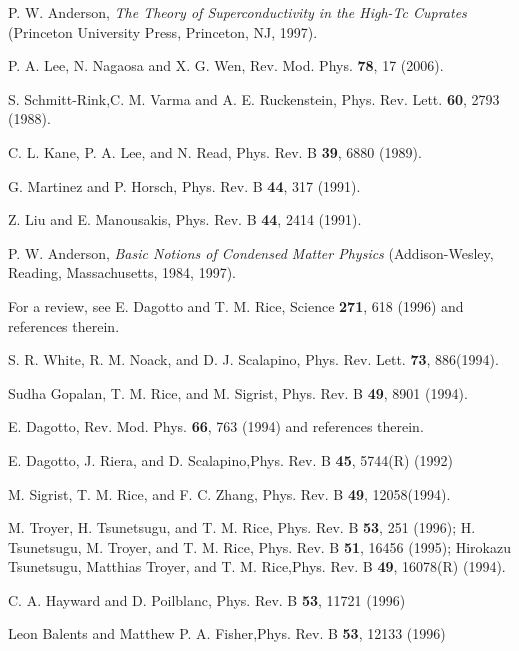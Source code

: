 \documentclass[aps,prb,twocolumn,notitlepage,superscriptaddress,showpacs]{revtex4-1}
\begin{document}
\begin{thebibliography}{99}

 P. W. Anderson, \emph{The Theory of Superconductivity in the High-Tc Cuprates} (Princeton University Press, Princeton, NJ, 1997).

 P. A. Lee, N. Nagaosa and X. G. Wen,  Rev. Mod. Phys. \textbf{78}, 17 (2006).

 S. Schmitt-Rink,C. M. Varma and A. E. Ruckenstein,   Phys. Rev. Lett. \textbf{60}, 2793 (1988).

 C. L. Kane, P. A. Lee, and N. Read,  Phys. Rev. B \textbf{39}, 6880 (1989).

 G. Martinez and P. Horsch, Phys. Rev. B \textbf{44}, 317 (1991).

 Z. Liu and E. Manousakis,  Phys. Rev. B \textbf{44}, 2414 (1991).

   P. W. Anderson, \emph{Basic Notions of Condensed Matter Physics} (Addison-Wesley, Reading, Massachusetts, 1984, 1997).

  For a review, see E. Dagotto and T. M. Rice, Science \textbf{271}, 618 (1996) and references therein.

 S. R. White, R. M. Noack, and D. J. Scalapino, Phys. Rev. Lett. \textbf{73}, 886(1994).

 Sudha Gopalan, T. M. Rice, and M. Sigrist, Phys. Rev. B \textbf{49}, 8901 (1994).

  E. Dagotto, Rev. Mod. Phys. \textbf{66}, 763 (1994) and references therein.

  E. Dagotto, J. Riera, and D. Scalapino,Phys. Rev. B \textbf{45}, 5744(R) (1992)

 M. Sigrist, T. M. Rice, and F. C. Zhang, Phys. Rev. B \textbf{49}, 12058(1994).

  M. Troyer, H. Tsunetsugu, and T. M. Rice, Phys. Rev. B \textbf{53}, 251 (1996); H. Tsunetsugu, M. Troyer, and T. M. Rice, Phys. Rev. B \textbf{51}, 16456 (1995); Hirokazu Tsunetsugu, Matthias Troyer, and T. M. Rice,Phys. Rev. B \textbf{49}, 16078(R) (1994).

     C. A. Hayward and D. Poilblanc, Phys. Rev. B \textbf{53}, 11721 (1996)

  Leon Balents and Matthew P. A. Fisher,Phys. Rev. B \textbf{53}, 12133 (1996)


\end{thebibliography}
\end{document}

